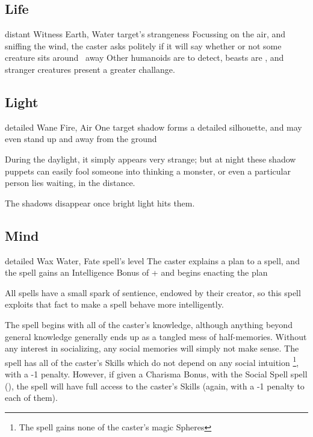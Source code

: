 \begin{multicols}{2}
\subsection{Life}


  {distant}%
  {Witness}%
  {Earth, Water}%
  {target's strangeness}%
  {Focussing on the air, and sniffing the wind, the caster asks politely if it will say whether or not some creature sits around \spellRange\ away}%
  {Other humanoids are \tn[7] to detect, beasts are \tn[9], and stranger creatures present a greater challange.}


\subsection{Light}



  {detailed}%
  {Wane}%
  {Fire, Air}%
  {}%
  {One target shadow forms a detailed silhouette, and may even stand up and away from the ground}%
  {During the daylight, it simply appears very strange; but at night these shadow puppets can easily fool someone into thinking a monster, or even a particular person lies waiting, in the distance.

  The shadows disappear once bright light hits them.}

\subsection{Mind}


  {detailed}%
  {Wax}%
  {Water, Fate}%
  {spell's level}%
  {The caster explains a plan to a spell, and the spell gains an Intelligence Bonus of + and begins enacting the plan}%
  {
  All spells have a small spark of sentience, endowed by their creator, so this spell exploits that fact to make a spell behave more intelligently.

  The spell begins with all of the caster's knowledge, although anything beyond general knowledge generally ends up as a tangled mess of half-memories.
  Without any interest in socializing, any social memories will simply not make sense.
  The spell has all of the caster's Skills which do not depend on any social intuition%
  \footnote{The spell gains none of the caster's magic Spheres},
  with a -1 penalty.
  However, if given a Charisma Bonus, with the Social Spell spell (), the spell will have full access to the caster's Skills (again, with a -1 penalty to each of them).

}
\end{multicols}

